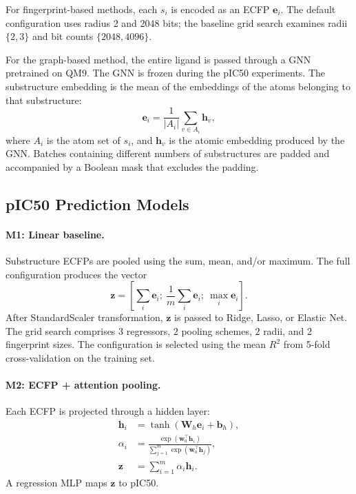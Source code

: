 For fingerprint-based methods, each \(s_i\) is encoded as an ECFP
\(\mathbf{e}_i\). The default configuration uses radius 2 and 2048 bits; the
baseline grid search examines radii \(\{2,3\}\) and bit counts
\(\{2048,4096\}\).

For the graph-based method, the entire ligand is passed through a GNN pretrained
on QM9. The GNN is frozen during the pIC50 experiments. The substructure
embedding is the mean of the embeddings of the atoms belonging to that
substructure:
\begin{equation}
    \mathbf{e}_i =
    \frac{1}{|A_i|}\sum_{v\in A_i}\mathbf{h}_v,
\end{equation}
where \(A_i\) is the atom set of \(s_i\), and \(\mathbf{h}_v\) is the atomic
embedding produced by the GNN. Batches containing different numbers of
substructures are padded and accompanied by a Boolean mask that excludes the
padding.

\subsection{pIC50 Prediction Models}

\paragraph{M1: Linear baseline.}
Substructure ECFPs are pooled using the sum, mean, and/or maximum. The full
configuration produces the vector
\begin{equation}
    \mathbf{z} =
    \left[
    \sum_i\mathbf{e}_i;\
    \frac{1}{m}\sum_i\mathbf{e}_i;\
    \max_i\mathbf{e}_i
    \right].
\end{equation}
After StandardScaler transformation, \(\mathbf{z}\) is passed to Ridge, Lasso,
or Elastic Net. The grid search comprises \(3\) regressors, \(2\) pooling
schemes, \(2\) radii, and \(2\) fingerprint sizes. The configuration is selected
using the mean \(R^2\) from 5-fold cross-validation on the training set.

\paragraph{M2: ECFP + attention pooling.}
Each ECFP is projected through a hidden layer:
\begin{align}
    \mathbf{h}_i &= \tanh(\mathbf{W}_h\mathbf{e}_i+\mathbf{b}_h),\\
    \alpha_i &=
    \frac{\exp(\mathbf{w}_a^\top\mathbf{h}_i)}
    {\sum_{j=1}^{m}\exp(\mathbf{w}_a^\top\mathbf{h}_j)},\\
    \mathbf{z} &= \sum_{i=1}^{m}\alpha_i\mathbf{h}_i.
\end{align}
A regression MLP maps \(\mathbf{z}\) to pIC50.

